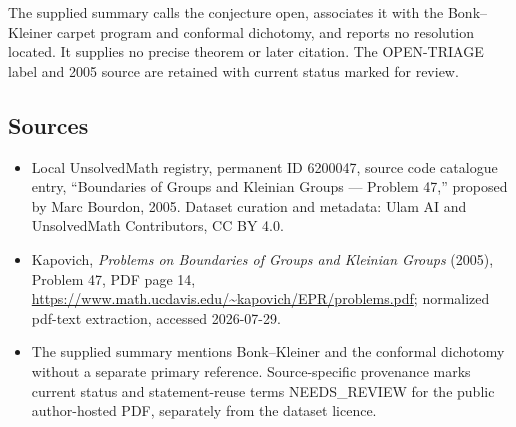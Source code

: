 \documentclass[11pt]{article}
\begin{document}
The supplied summary calls the conjecture open, associates it with the Bonk--Kleiner carpet program and conformal dichotomy, and reports no resolution located. It supplies no precise theorem or later citation. The OPEN-TRIAGE label and 2005 source are retained with current status marked for review.
\subsection{Sources}
\begin{itemize}
\item Local UnsolvedMath registry, permanent ID 6200047, source code catalogue entry, ``Boundaries of Groups and Kleinian Groups --- Problem 47,'' proposed by Marc Bourdon, 2005. Dataset curation and metadata: Ulam AI and UnsolvedMath Contributors, CC BY 4.0.
\item Kapovich, \emph{Problems on Boundaries of Groups and Kleinian Groups} (2005), Problem 47, PDF page 14, \url{https://www.math.ucdavis.edu/~kapovich/EPR/problems.pdf}; normalized pdf-text extraction, accessed 2026-07-29.
\item The supplied summary mentions Bonk--Kleiner and the conformal dichotomy without a separate primary reference. Source-specific provenance marks current status and statement-reuse terms NEEDS\_REVIEW for the public author-hosted PDF, separately from the dataset licence.
\end{itemize}
\end{document}
